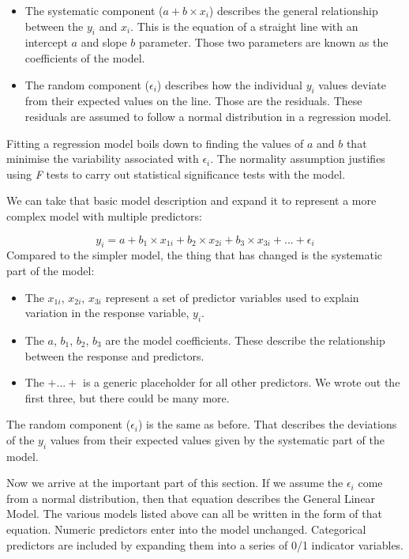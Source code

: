 \documentclass[
]{book}
\providecommand{\tightlist}{%
  \setlength{\itemsep}{0pt}\setlength{\parskip}{0pt}}
\begin{document}
\begin{itemize}
\tightlist
\item
  The systematic component (\(a + b \times x_i\)) describes the general relationship between the \(y_i\) and \(x_i\). This is the equation of a straight line with an intercept \(a\) and slope \(b\) parameter. Those two parameters are known as the coefficients of the model.
\item
  The random component (\(\epsilon_i\)) describes how the individual \(y_i\) values deviate from their expected values on the line. Those are the residuals. These residuals are assumed to follow a normal distribution in a regression model.
\end{itemize}

Fitting a regression model boils down to finding the values of \(a\) and \(b\) that minimise the variability associated with \(\epsilon_i\). The normality assumption justifies using \emph{F} tests to carry out statistical significance tests with the model.

We can take that basic model description and expand it to represent a more complex model with multiple predictors:

\[y_i = a + b_1 \times x_{1i} + b_2 \times x_{2i} + b_3 \times x_{3i} + ... + \epsilon_i\]
Compared to the simpler model, the thing that has changed is the systematic part of the model:

\begin{itemize}
\tightlist
\item
  The \(x_{1i}\), \(x_{2i}\), \(x_{3i}\) represent a set of predictor variables used to explain variation in the response variable, \(y_i\).
\item
  The \(a\), \(b_1\), \(b_2\), \(b_3\) are the model coefficients. These describe the relationship between the response and predictors.
\item
  The \(+ ... +\) is a generic placeholder for all other predictors. We wrote out the first three, but there could be many more.
\end{itemize}

The random component (\(\epsilon_i\)) is the same as before. That describes the deviations of the \(y_i\) values from their expected values given by the systematic part of the model.

Now we arrive at the important part of this section. If we assume the \(\epsilon_i\) come from a normal distribution, then that equation describes the General Linear Model. The various models listed above can all be written in the form of that equation. Numeric predictors enter into the model unchanged. Categorical predictors are included by expanding them into a series of 0/1 indicator variables.
\end{document}
